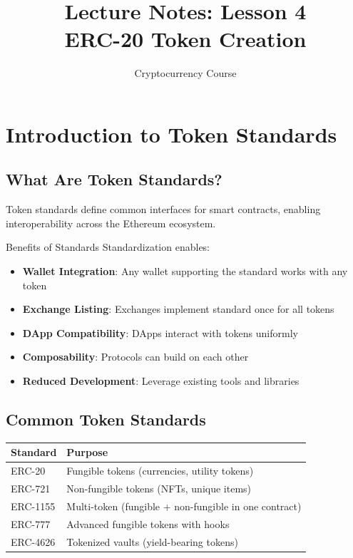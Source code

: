 \documentclass[11pt,a4paper]{article}
\title{\textbf{Lecture Notes: Lesson 4}\\ERC-20 Token Creation}
\author{Cryptocurrency Course}
\date{}
\begin{document}
\maketitle

\tableofcontents
\newpage

\section{Introduction to Token Standards}

\subsection{What Are Token Standards?}

Token standards define common interfaces for smart contracts, enabling interoperability across the Ethereum ecosystem.

\begin{keybox}{Benefits of Standards}
Standardization enables:
\begin{itemize}
  \item \textbf{Wallet Integration}: Any wallet supporting the standard works with any token
  \item \textbf{Exchange Listing}: Exchanges implement standard once for all tokens
  \item \textbf{DApp Compatibility}: DApps interact with tokens uniformly
  \item \textbf{Composability}: Protocols can build on each other
  \item \textbf{Reduced Development}: Leverage existing tools and libraries
\end{itemize}
\end{keybox}

\subsection{Common Token Standards}

\begin{center}
\begin{tabular}{|l|p{10cm}|}
\hline
\textbf{Standard} & \textbf{Purpose} \\
\hline
ERC-20 & Fungible tokens (currencies, utility tokens) \\
ERC-721 & Non-fungible tokens (NFTs, unique items) \\
ERC-1155 & Multi-token (fungible + non-fungible in one contract) \\
ERC-777 & Advanced fungible tokens with hooks \\
ERC-4626 & Tokenized vaults (yield-bearing tokens) \\
\hline
\end{tabular}
\end{center}
\end{document}
